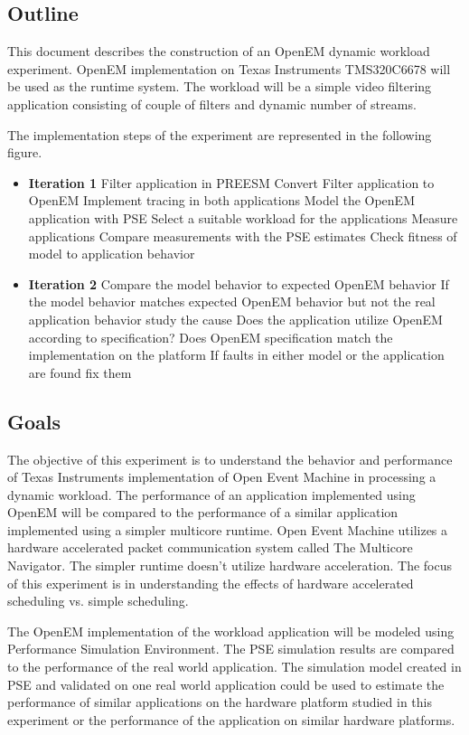 \subsection{Outline}
This document describes the construction of an OpenEM dynamic workload experiment. OpenEM implementation on Texas Instruments TMS320C6678 will be used as the runtime system. The workload will be a simple video filtering application consisting of couple of filters and dynamic number of streams.

The implementation steps of the experiment are represented in the following figure.

\begin{itemize}
\item[] \textbf{Iteration 1}
    \subitem Filter application in PREESM
    \subitem Convert Filter application to OpenEM
    \subitem Implement tracing in both applications
    \subitem Model the OpenEM application with PSE
    \subitem Select a suitable workload for the applications
    \subitem Measure applications
    \subitem Compare measurements with the PSE estimates
    \subitem Check fitness of model to application behavior
\item[] \textbf{Iteration 2}
    \subitem Compare the model behavior to expected OpenEM behavior
    \subitem If the model behavior matches expected OpenEM behavior but not the real application behavior study the cause
    \subitem Does the application utilize OpenEM according to specification?
    \subitem Does OpenEM specification match the implementation on the platform
    \subitem If faults in either model or the application are found fix them
\end{itemize}

\subsection{Goals}
The objective of this experiment is to understand the behavior and performance of Texas Instruments implementation of Open Event Machine in processing a dynamic workload. The performance of an application implemented using OpenEM will be compared to the performance of a similar application implemented using a simpler multicore runtime. Open Event Machine utilizes a hardware accelerated packet communication system called The Multicore Navigator. The simpler runtime doesn't utilize hardware acceleration. The focus of this experiment is in understanding the effects of hardware accelerated scheduling vs. simple scheduling.

The OpenEM implementation of the workload application will be modeled using Performance Simulation Environment. The PSE simulation results are compared to the performance of the real world application. The simulation model created in PSE and validated on one real world application could be used to estimate the performance of similar applications on the hardware platform studied in this experiment or the performance of the application on similar hardware platforms.